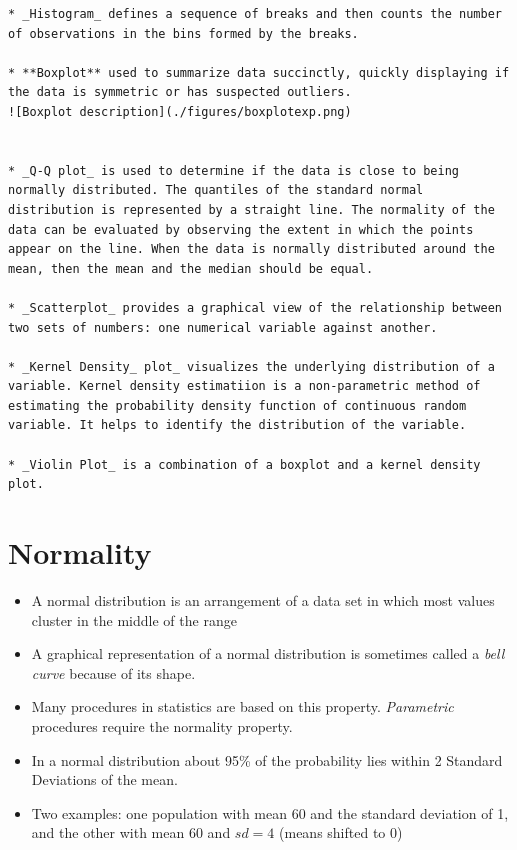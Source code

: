 \documentclass[]{book}
\providecommand{\tightlist}{%
  \setlength{\itemsep}{0pt}\setlength{\parskip}{0pt}}
\begin{document}
\begin{verbatim}
* _Histogram_ defines a sequence of breaks and then counts the number of observations in the bins formed by the breaks.

* **Boxplot** used to summarize data succinctly, quickly displaying if the data is symmetric or has suspected outliers.  
![Boxplot description](./figures/boxplotexp.png)
  
  
* _Q-Q plot_ is used to determine if the data is close to being normally distributed. The quantiles of the standard normal distribution is represented by a straight line. The normality of the data can be evaluated by observing the extent in which the points appear on the line. When the data is normally distributed around the mean, then the mean and the median should be equal. 

* _Scatterplot_ provides a graphical view of the relationship between two sets of numbers: one numerical variable against another. 

* _Kernel Density_ plot_ visualizes the underlying distribution of a variable. Kernel density estimatiion is a non-parametric method of estimating the probability density function of continuous random variable. It helps to identify the distribution of the variable.

* _Violin Plot_ is a combination of a boxplot and a kernel density plot. 
\end{verbatim}

\section{Normality}\label{normality}

\begin{itemize}
\tightlist
\item
  A normal distribution is an arrangement of a data set in which most
  values cluster in the middle of the range
\item
  A graphical representation of a normal distribution is sometimes
  called a \emph{bell curve} because of its shape.
\item
  Many procedures in statistics are based on this property.
  \emph{Parametric} procedures require the normality property.
\item
  In a normal distribution about 95\% of the probability lies within 2
  Standard Deviations of the mean.
\item
  Two examples: one population with mean 60 and the standard deviation
  of 1, and the other with mean 60 and \(sd=4\) (means shifted to 0)
\end{itemize}
\end{document}
